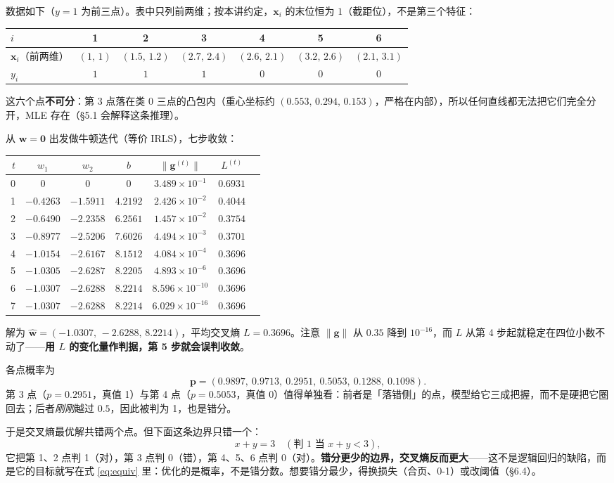 \documentclass[11pt,a4paper,fontset=windows,zihao=-4]{ctexart}
\newcommand{\bw}{\mathbf{w}}
\newcommand{\bx}{\mathbf{x}}
\newcommand{\bg}{\mathbf{g}}
\newcommand{\bp}{\mathbf{p}}
\newcommand{\bzero}{\mathbf{0}}
\newcommand{\norm}[1]{\lVert #1\rVert}
\newcommand{\tabhead}{\sffamily\bfseries\color{navy}}
\begin{document}
\begin{exm}
数据如下（$y=1$ 为前三点）。表中只列前两维；按本讲约定，$\bx_i$ 的末位恒为 $1$（截距位），不是第三个特征：
\begin{center}
\small
\begin{tabular}{@{}lcccccc@{}}
\toprule
\rowcolor{navy!7}
\tabhead $i$ & 1 & 2 & 3 & 4 & 5 & 6\\
\midrule
$\bx_i$（前两维） & $(1,\,1)$ & $(1.5,\,1.2)$ & $(2.7,\,2.4)$ & $(2.6,\,2.1)$ & $(3.2,\,2.6)$ & $(2.1,\,3.1)$\\
$y_i$ & $1$ & $1$ & $1$ & $0$ & $0$ & $0$\\
\bottomrule
\end{tabular}
\end{center}
这六个点\textbf{不可分}：第 3 点落在类 0 三点的凸包内（重心坐标约 $(0.553,\,0.294,\,0.153)$，严格在内部），所以任何直线都无法把它们完全分开，MLE 存在（\S5.1 会解释这条推理）。

从 $\bw=\bzero$ 出发做牛顿迭代（等价 IRLS），七步收敛：
\begin{center}
\small
\begin{tabular}{@{}rcccccc@{}}
\toprule
\rowcolor{navy!7}
\tabhead $t$ & \tabhead $w_1$ & \tabhead $w_2$ & \tabhead $b$ & \tabhead $\norm{\bg^{(t)}}$ & \tabhead $L^{(t)}$\\
\midrule
0 & $0$ & $0$ & $0$ & $3.489\times10^{-1}$ & $0.6931$\\
1 & $-0.4263$ & $-1.5911$ & $4.2192$ & $2.426\times10^{-2}$ & $0.4044$\\
2 & $-0.6490$ & $-2.2358$ & $6.2561$ & $1.457\times10^{-2}$ & $0.3754$\\
3 & $-0.8977$ & $-2.5206$ & $7.6026$ & $4.494\times10^{-3}$ & $0.3701$\\
4 & $-1.0154$ & $-2.6167$ & $8.1512$ & $4.084\times10^{-4}$ & $0.3696$\\
5 & $-1.0305$ & $-2.6287$ & $8.2205$ & $4.893\times10^{-6}$ & $0.3696$\\
6 & $-1.0307$ & $-2.6288$ & $8.2214$ & $8.596\times10^{-10}$ & $0.3696$\\
7 & $-1.0307$ & $-2.6288$ & $8.2214$ & $6.029\times10^{-16}$ & $0.3696$\\
\bottomrule
\end{tabular}
\end{center}
解为 $\hat{\bw}=(-1.0307,\,-2.6288,\,8.2214)$，平均交叉熵 $L=0.3696$。注意 $\norm{\bg}$ 从 $0.35$ 降到 $10^{-16}$，而 $L$ 从第 4 步起就稳定在四位小数不动了——\textbf{用 $L$ 的变化量作判据，第 5 步就会误判收敛}。

各点概率为
\[
  \bp=(0.9897,\ 0.9713,\ 0.2951,\ 0.5053,\ 0.1288,\ 0.1098).
\]
第 3 点（$p=0.2951$，真值 1）与第 4 点（$p=0.5053$，真值 0）值得单独看：前者是「落错侧」的点，模型给它三成把握，而不是硬把它圈回去；后者\emph{刚刚}越过 $0.5$，因此被判为 1，也是错分。

于是交叉熵最优解共错两个点。但下面这条边界只错一个：
\[
  x+y=3\quad(\text{判 1 当 } x+y<3),
\]
它把第 1、2 点判 1（对），第 3 点判 0（错），第 4、5、6 点判 0（对）。\textbf{错分更少的边界，交叉熵反而更大}——这不是逻辑回归的缺陷，而是它的目标就写在式 \eqref{eq:equiv} 里：优化的是概率，不是错分数。想要错分最少，得换损失（合页、0-1）或改阈值（\S6.4）。
\end{exm}
\end{document}
